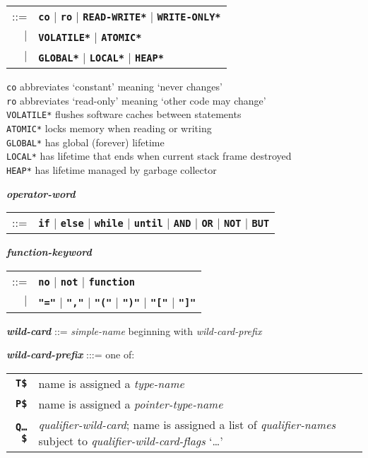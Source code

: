 \documentclass[12pt]{article}
\newcommand{\TT}[1]{{\tt \bfseries #1}}
\newcommand{\ttkey}[1]{{\tt \bfseries #1}}
\newcommand{\emkey}[1]{{\em \bfseries #1}}
\newcommand{\ttakey}[1]{{\tt \bfseries *#1*}}
\newenvironment{indpar}[1][0.3in]%
	{\begin{list}{}%
		     {\setlength{\itemsep}{0in}%
		      \setlength{\topsep}{0in}%
		      \setlength{\parsep}{1ex}%
		      \setlength{\labelwidth}{#1}%
		      \setlength{\leftmargin}{#1}%
		      \addtolength{\leftmargin}{\labelsep}}%
	 \item}%
	{\end{list}}
\begin{document}
\begin{indpar}
    \begin{tabular}[t]{rl}
    ::= & \ttkey{co} $|$ \ttkey{ro} $|$ \ttakey{READ-WRITE}
                     $|$ \ttakey{WRITE-ONLY} \\
    $|$ & \ttakey{VOLATILE} $|$ \ttakey{ATOMIC} \\
    $|$ & \ttakey{GLOBAL} $|$ \ttakey{LOCAL} $|$ \ttakey{HEAP} \\
    \end{tabular}
\begin{indpar}
{\tt co} abbreviates `constant' meaning `never changes' \\
{\tt ro} abbreviates `read-only' meaning `other code may change' \\
{\tt *VOLATILE*} flushes software caches between statements \\
{\tt *ATOMIC*} locks memory when reading or writing \\
{\tt *GLOBAL*} has global (forever) lifetime \\
{\tt *LOCAL*} has lifetime that ends when current stack frame destroyed \\
{\tt *HEAP*} has lifetime managed by garbage collector
\end{indpar}
\emkey{operator-word}
    \begin{tabular}[t]{rl}
    ::= & \TT{if} $|$ \TT{else} $|$ \TT{while} $|$ \TT{until}
                  $|$ \TT{AND} $|$ \TT{OR}
		  $|$ \TT{NOT} $|$ \TT{BUT}
    \end{tabular}

\emkey{function-keyword}
    \begin{tabular}[t]{rl}
    ::= & \TT{no} $|$ \TT{not} $|$ \TT{function} \\
    $|$ & \TT{"="} $|$ \TT{","} $|$ \TT{"("} $|$ \TT{")"} $|$
          \TT{"["} $|$ \TT{"]"}
    \end{tabular}

\emkey{wild-card}\label{WILD-CARD}
    ::= {\em simple-name} beginning with {\em wild-card-prefix}

\emkey{wild-card-prefix}\label{WILD-CARD-PREFIX} :::= one of: \\
\hspace*{0.2in}\begin{tabular}{rp{4in}}
\ttkey{T\$} & name is assigned a {\em type-name} \\
\ttkey{P\$} & name is assigned a {\em pointer-type-name} \\
\ttkey{Q\ldots\$} & {\em qualifier-wild-card}; name is assigned a
                    list of {\em qualifier-names} subject to
		    {\em qualifier-wild-card-flags} `\ldots'\\
\end{tabular}


\end{indpar}
\end{document}
